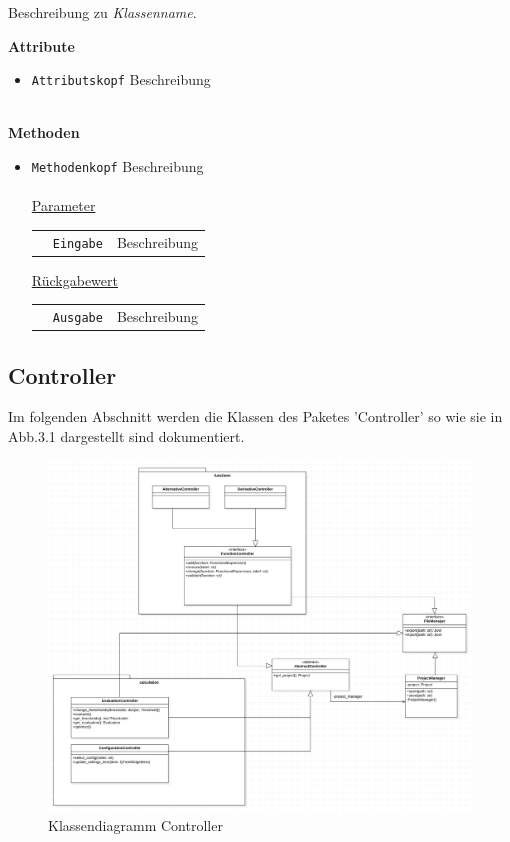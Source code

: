 \documentclass{article}
\begin{document}
Beschreibung zu \textit{Klassenname}.
\newline \newline

\textbf{{Attribute}}
\begin{itemize}
\item \texttt{Attributskopf} \newline Beschreibung
\\\\
\end{itemize}

\textbf{{Methoden}}
\begin{itemize}
\item \texttt{Methodenkopf} \newline Beschreibung
\\\\
\underline{{Parameter}}
\begin{tabular}{lll}
 & \texttt{Eingabe} & Beschreibung \\
\end{tabular}

\underline{{Rückgabewert}}
\begin{tabular}{lll}
 & \texttt{Ausgabe} & Beschreibung \\
\end{tabular}
\end{itemize}

\newpage
\subsection{Controller}

Im folgenden Abschnitt werden die Klassen des Paketes 'Controller' so wie sie in Abb.3.1 dargestellt sind dokumentiert.

\begin{figure}[H]%
    \centering
    \includegraphics[width=13cm]{entwurf/Entwurf_dokument/img/Floriane/ControllerklassendiagrammTemporaer.png}
    \caption{Klassendiagramm Controller}
\end{figure}
\end{document}
